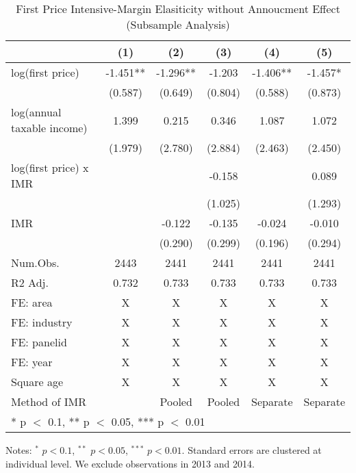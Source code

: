 \documentclass[
  11pt,
  a4paper,
]{article}
\begin{document}
\begin{table}

\caption{\label{tab:robustbenchmark1}First Price Intensive-Margin Elasiticity without Annoucment Effect (Subsample Analysis)}
\centering
\fontsize{9}{11}\selectfont
\begin{threeparttable}
\begin{tabular}[t]{lccccc}
\toprule
  & (1) & (2) & (3) & (4) & (5)\\
\midrule
log(first price) & -1.451** & -1.296** & -1.203 & -1.406** & -1.457*\\
 & (0.587) & (0.649) & (0.804) & (0.588) & (0.873)\\
log(annual taxable income) & 1.399 & 0.215 & 0.346 & 1.087 & 1.072\\
 & (1.979) & (2.780) & (2.884) & (2.463) & (2.450)\\
log(first price) x IMR &  &  & -0.158 &  & 0.089\\
 &  &  & (1.025) &  & (1.293)\\
IMR &  & -0.122 & -0.135 & -0.024 & -0.010\\
 &  & (0.290) & (0.299) & (0.196) & (0.294)\\
\midrule
Num.Obs. & 2443 & 2441 & 2441 & 2441 & 2441\\
R2 Adj. & 0.732 & 0.733 & 0.733 & 0.733 & 0.733\\
FE: area & X & X & X & X & X\\
FE: industry & X & X & X & X & X\\
FE: panelid & X & X & X & X & X\\
FE: year & X & X & X & X & X\\
Square age & X & X & X & X & X\\
Method of IMR &  & Pooled & Pooled & Separate & Separate\\
\bottomrule
\multicolumn{6}{l}{\rule{0pt}{1em}* p $<$ 0.1, ** p $<$ 0.05, *** p $<$ 0.01}\\
\end{tabular}
\begin{tablenotes}
\item Notes: $^{*}$ $p < 0.1$, $^{**}$ $p < 0.05$, $^{***}$ $p < 0.01$. Standard errors are clustered at individual level. We exclude observations in 2013 and 2014.
\end{tablenotes}
\end{threeparttable}
\end{table}
\end{document}
